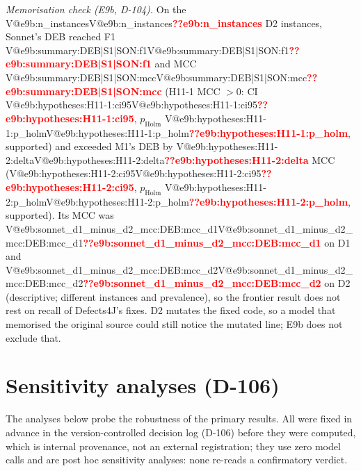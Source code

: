 \documentclass[pdflatex,iicol,sn-mathphys-num]{sn-jnl}
\makeatletter
\newcommand{\V}[1]{\ifcsname V@#1\endcsname\csname V@#1\endcsname\else\textbf{\textcolor{red}{??#1}}\fi}
\makeatother
\begin{document}
\begin{appendices}
\noindent\textit{Memorisation check (E9b, D-104).} On the \V{e9b:n_instances} D2 instances, Sonnet's DEB reached F1 \V{e9b:summary:DEB|S1|SON:f1} and MCC \V{e9b:summary:DEB|S1|SON:mcc} (H11-1 MCC $>0$: CI \V{e9b:hypotheses:H11-1:ci95}, $p_\mathrm{Holm}$ \V{e9b:hypotheses:H11-1:p_holm}, supported) and exceeded M1's DEB by \V{e9b:hypotheses:H11-2:delta} MCC (\V{e9b:hypotheses:H11-2:ci95}, $p_\mathrm{Holm}$ \V{e9b:hypotheses:H11-2:p_holm}, supported). Its MCC was \V{e9b:sonnet_d1_minus_d2_mcc:DEB:mcc_d1} on D1 and \V{e9b:sonnet_d1_minus_d2_mcc:DEB:mcc_d2} on D2 (descriptive; different instances and prevalence), so the frontier result does not rest on recall of Defects4J's fixes. D2 mutates the fixed code, so a model that memorised the original source could still notice the mutated line; E9b does not exclude that.

\section{Sensitivity analyses (D-106)}\label{app:review}
\setcounter{table}{0}\setcounter{figure}{0}%

\noindent The analyses below probe the robustness of the primary results. All were fixed in advance in the version-controlled decision log (D-106) before they were computed, which is internal provenance, not an external registration; they use zero model calls and are post hoc sensitivity analyses: none re-reads a confirmatory verdict.


\end{appendices}
\end{document}
